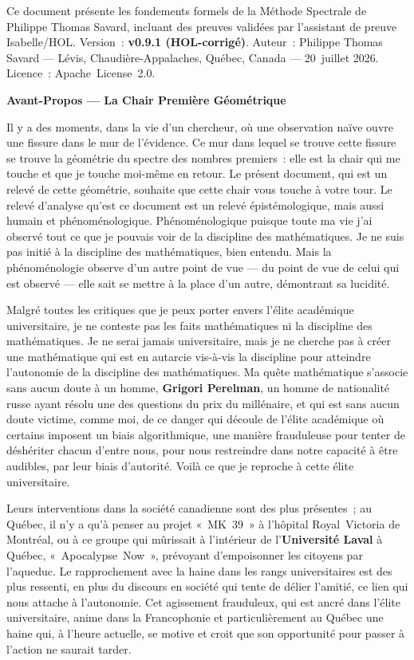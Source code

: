 \documentclass[]{pasj02}
\makeatletter
\newcommand{\unnumberedsection}[1]{%
  \bigskip\par
  \phantomsection
  \addcontentsline{toc}{section}{#1}%
  {\noindent\Large\bfseries #1\par}%
  \nopagebreak\medskip\@afterheading
}
\makeatother
\begin{document}
Ce document présente les fondements formels de la Méthode Spectrale de
Philippe Thomas Savard, incluant des preuves validées par l'assistant de
preuve Isabelle/HOL.  Version~: \textbf{v0.9.1 (HOL-corrigé)}.
Auteur~: Philippe Thomas Savard --- Lévis, Chaudière-Appalaches, Québec,
Canada --- 20~juillet 2026.  Licence~: Apache~License~2.0.

\unnumberedsection{Avant-Propos --- La Chair Première Géométrique}

Il y a des moments, dans la vie d'un chercheur, où une observation naïve
ouvre une fissure dans le mur de l'évidence.  Ce mur dans lequel se trouve
cette fissure se trouve la géométrie du spectre des nombres premiers~:
elle est la chair qui me touche et que je touche moi-même en retour.  Le
présent document, qui est un relevé de cette géométrie, souhaite que
cette chair vous touche à votre tour.  Le relevé d'analyse qu'est ce
document est un relevé épistémologique, mais aussi humain et
phénoménologique.  Phénoménologique puisque toute ma vie j'ai observé
tout ce que je pouvais voir de la discipline des mathématiques.  Je ne
suis pas initié à la discipline des mathématiques, bien entendu.  Mais
la phénoménologie observe d'un autre point de vue --- du point de vue de
celui qui est observé --- elle sait se mettre à la place d'un autre,
démontrant sa lucidité.

Malgré toutes les critiques que je peux porter envers l'élite académique
universitaire, je ne conteste pas les faits mathématiques ni la
discipline des mathématiques.  Je ne serai jamais universitaire, mais je
ne cherche pas à créer une mathématique qui est en autarcie vis-à-vis
la discipline pour atteindre l'autonomie de la discipline des
mathématiques.  Ma quête mathématique s'associe sans aucun doute à un
homme, \textbf{Grigori Perelman}, un homme de nationalité russe ayant
résolu une des questions du prix du millénaire, et qui est sans aucun
doute victime, comme moi, de ce danger qui découle de l'élite académique
où certains imposent un biais algorithmique, une manière frauduleuse
pour tenter de déshériter chacun d'entre nous, pour nous restreindre
dans notre capacité à être audibles, par leur biais d'autorité.  Voilà
ce que je reproche à cette élite universitaire.

Leurs interventions dans la société canadienne sont des plus présentes~;
au Québec, il n'y a qu'à penser au projet «~MK~39~» à l'hôpital
Royal~Victoria de Montréal, ou à ce groupe qui mûrissait à l'intérieur
de l'\textbf{Université Laval} à Québec, «~Apocalypse~Now~», prévoyant
d'empoisonner les citoyens par l'aqueduc.  Le rapprochement avec la
haine dans les rangs universitaires est des plus ressenti, en plus du
discours en société qui tente de délier l'amitié, ce lien qui nous
attache à l'autonomie.  Cet agissement frauduleux, qui est ancré dans
l'élite universitaire, anime dans la Francophonie et particulièrement
au Québec une haine qui, à l'heure actuelle, se motive et croit que son
opportunité pour passer à l'action ne saurait tarder.
\end{document}
